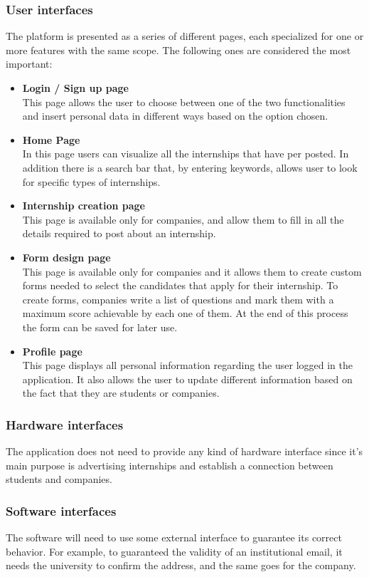 \documentclass[11pt,twoside]{article}
\begin{document}
		\subsubsection{User interfaces}
The platform is presented as a series of different pages, each specialized for one or more features with the same scope. The following ones are considered the most important:
\begin{itemize}
\item \textbf{Login / Sign up page} \\
This page allows the user to choose between one of the two functionalities and insert personal data in different ways based on the option chosen.
\item \textbf{Home Page} \\
In this page users can visualize all the internships that have per posted. In addition there is a search bar that, by entering keywords, allows user to look for specific types of internships.
\item \textbf{Internship creation page} \\
This page is available only for companies, and allow them to fill in all the details required to post about an internship.
\item \textbf{Form design page} \\
This page is available only for companies and it allows them to create custom forms needed to select the candidates that apply for their internship. To create forms, companies write a list of questions and mark them with a maximum score achievable by each one of them. At the end of this process the form can be saved for later use.
\item \textbf{Profile page} \\
This page displays all personal information regarding the user logged in the application. It also allows the user to update different information based on the fact that they are students or companies.
\end{itemize}
		\subsubsection{Hardware interfaces}
The application does not need to provide any kind of hardware interface since it's main purpose is advertising internships and establish a connection between students and companies.
		\subsubsection{Software interfaces}
The software will need to use some external interface to guarantee its correct behavior. For example, to guaranteed the validity of an institutional email, it needs the university to confirm the address, and the same goes for the company.
\end{document}
